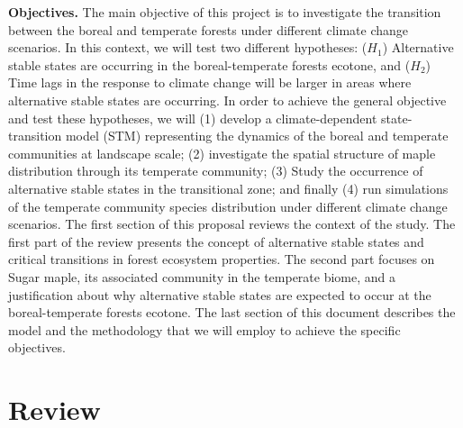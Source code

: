 \textbf{Objectives.} The main objective of this project is to investigate the
transition between the boreal and temperate forests under different climate
change scenarios. In this context, we will test two different hypotheses:
($H_1$) Alternative stable states are occurring in the boreal-temperate forests
ecotone, and ($H_2$) Time lags in the response to climate change will be larger
in areas where alternative stable states are occurring. In order to achieve the
general objective and test these hypotheses, we will (1) develop a climate-dependent 
state-transition model (STM) representing the dynamics of the
boreal and temperate communities at landscape scale; (2) investigate the
spatial structure of maple distribution through its temperate community; (3)
Study the occurrence of alternative stable states in the transitional zone;
and finally (4) run simulations of the temperate community species
distribution under different climate change scenarios. The first section of
this proposal reviews the context of the study. The first part of the review
presents the concept of alternative stable states and critical transitions in
forest ecosystem properties. The second part focuses on Sugar maple, its
associated community in the temperate biome, and a justification about why
alternative stable states are expected to occur at the boreal-temperate
forests ecotone. The last section of this document describes the model and
the methodology that we will employ to achieve the specific objectives. 

\section{Review} 

